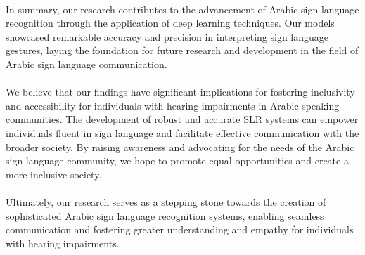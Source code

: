 \paragraph{}
In summary, our research contributes to the advancement of Arabic sign language recognition through the application of deep learning techniques. Our models showcased remarkable accuracy and precision in interpreting sign language gestures, laying the foundation for future research and development in the field of Arabic sign language communication.
\paragraph{}
We believe that our findings have significant implications for fostering inclusivity and accessibility for individuals with hearing impairments in Arabic-speaking communities. The development of robust and accurate SLR systems can empower individuals fluent in sign language and facilitate effective communication with the broader society. By raising awareness and advocating for the needs of the Arabic sign language community, we hope to promote equal opportunities and create a more inclusive society.
\paragraph{}
Ultimately, our research serves as a stepping stone towards the creation of sophisticated Arabic sign language recognition systems, enabling seamless communication and fostering greater understanding and empathy for individuals with hearing impairments.
